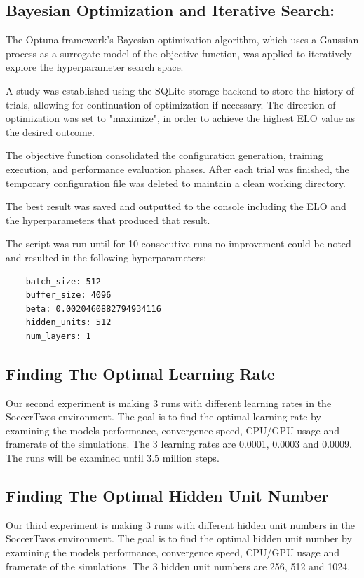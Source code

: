 \documentclass{LSkill}
\begin{document}
\subsection{ Bayesian Optimization and Iterative Search:}
The Optuna framework's Bayesian optimization algorithm, which uses a Gaussian process as a surrogate model of the objective function, was applied to iteratively explore the hyperparameter search space.

A study was established using the SQLite storage backend to store the history of trials, allowing for continuation of optimization if necessary. The direction of optimization was set to "maximize", in order to achieve the highest ELO value as the desired outcome.

The objective function consolidated the configuration generation, training execution, and performance evaluation phases. After each trial was finished, the temporary configuration file was deleted to maintain a clean working directory.

The best result was saved and outputted to the console including the ELO and the hyperparameters that produced that result.

The script was run until for 10 consecutive runs no improvement could be noted and resulted in the following hyperparameters:


\begin{verbatim}
    batch_size: 512
    buffer_size: 4096
    beta: 0.0020460882794934116
    hidden_units: 512
    num_layers: 1
\end{verbatim}

\subsection{Finding The Optimal Learning Rate}
Our second experiment is making 3 runs with different learning rates in the SoccerTwos environment. The goal is to find the optimal learning rate by examining the models performance, convergence speed, CPU/GPU usage and framerate of the simulations. The 3 learning rates are 0.0001, 0.0003 and 0.0009. The runs will be examined until 3.5 million steps.

\subsection{Finding The Optimal Hidden Unit Number}
Our third experiment is making 3 runs with different hidden unit numbers in the SoccerTwos environment. The goal is to find the optimal hidden unit number by examining the models performance, convergence speed, CPU/GPU usage and framerate of the simulations. The 3 hidden unit numbers are 256, 512 and 1024.
 
\end{document}
